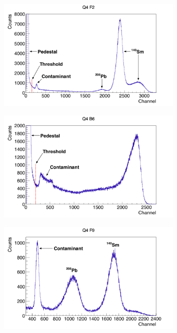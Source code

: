 \documentclass[twoside,english]{uiofysmaster/uiofysmaster}
\begin{document}
\begin{figure}[ht]
	\centering
	\begin{subfigure}[t]{0.49\textwidth}
		\centering
		\includegraphics[width=\textwidth]{../Plots/plotting/Threshold_Q4_f2.png}
		\caption{}
		\label{fig:th_f}
	\end{subfigure}
	\hfill 
	\begin{subfigure}[t]{0.49\textwidth}
		\centering
    		\includegraphics[width=\textwidth]{../Plots/plotting/Threshold_Q4_b6.png}
		\caption{}
		\label{fig:th_b}
	\end{subfigure}
	\begin{subfigure}[t]{0.49\textwidth}
		\centering
		\includegraphics[width=\textwidth]{../Plots/plotting/TB_Q4_F9.png}

\end{subfigure}
\end{figure}
\end{document}
